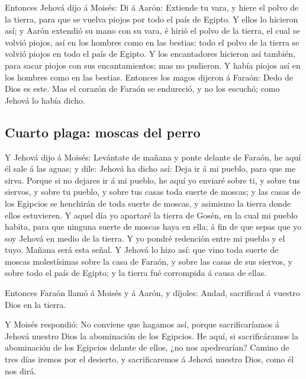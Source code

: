  Entonces Jehová dijo á Moisés: Di á Aarón: Extiende tu
vara, y hiere el polvo de la tierra, para que se vuelva piojos por todo
el país de Egipto.  Y ellos lo hicieron así; y Aarón
extendió su mano con su vara, é hirió el polvo de la tierra, el cual se
volvió piojos, así en los hombres como en las bestias: todo el polvo de
la tierra se volvió piojos en todo el país de Egipto.  Y
los encantadores hicieron así también, para sacar piojos con sus
encantamientos; mas no pudieron. Y había piojos así en los hombres como
en las bestias.  Entonces los magos dijeron á Faraón: Dedo
de Dios es este. Mas el corazón de Faraón se endureció, y no los
escuchó; como Jehová lo había dicho.

\hypertarget{cuarto-plaga-moscas-del-perro}{%
\subsection{Cuarto plaga: moscas del
perro}\label{cuarto-plaga-moscas-del-perro}}

 Y Jehová dijo á Moisés: Levántate de mañana y ponte
delante de Faraón, he aquí él sale á las aguas; y dile: Jehová ha dicho
así: Deja ir á mi pueblo, para que me sirva.  Porque si no
dejares ir á mi pueblo, he aquí yo enviaré sobre ti, y sobre tus
siervos, y sobre tu pueblo, y sobre tus casas toda suerte de moscas; y
las casas de los Egipcios se henchirán de toda suerte de moscas, y
asimismo la tierra donde ellos estuvieren.  Y aquel día yo
apartaré la tierra de Gosén, en la cual mi pueblo habita, para que
ninguna suerte de moscas haya en ella; á fin de que sepas que yo soy
Jehová en medio de la tierra.  Y yo pondré redención entre
mi pueblo y el tuyo. Mañana será esta señal.  Y Jehová lo
hizo así: que vino toda suerte de moscas molestísimas sobre la casa de
Faraón, y sobre las casas de sus siervos, y sobre todo el país de
Egipto; y la tierra fué corrompida á causa de ellas.

 Entonces Faraón llamó á Moisés y á Aarón, y díjoles:
Andad, sacrificad á vuestro Dios en la tierra.

 Y Moisés respondió: No conviene que hagamos así, porque
sacrificaríamos á Jehová nuestro Dios la abominación de los Egipcios. He
aquí, si sacrificáramos la abominación de los Egipcios delante de ellos,
¿no nos apedrearían?  Camino de tres días iremos por el
desierto, y sacrificaremos á Jehová nuestro Dios, como él nos dirá.

